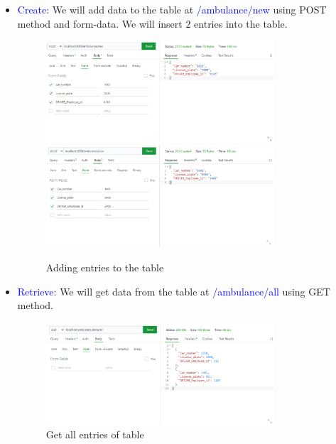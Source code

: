 \documentclass[a4paper]{article}
\numberwithin{equation}{section}
\begin{document}
\begin{itemize}
    \item \textcolor{blue}{Create}:
    We will add data to the table at \textcolor{blue}{/ambulance/new} using POST method and form-data.
    We will insert 2 entries into the table.
    \begin{figure}[H]
        \centering
        \includegraphics[width=0.8\textwidth]{./assets/api_new1.png}
        \includegraphics[width=0.8\textwidth]{./assets/api_new2.png}
        \caption{Adding entries to the table}
    \end{figure}
    
        \item \textcolor{blue}{Retrieve}:
    We will get data from the table at \textcolor{blue}{/ambulance/all} using GET method.
    \begin{figure}[H]
        \centering
        \includegraphics[width=0.8\textwidth]{./assets/api_all.png}
        \caption{Get all entries of table}
    \end{figure}
    

\end{itemize}
\end{document}
